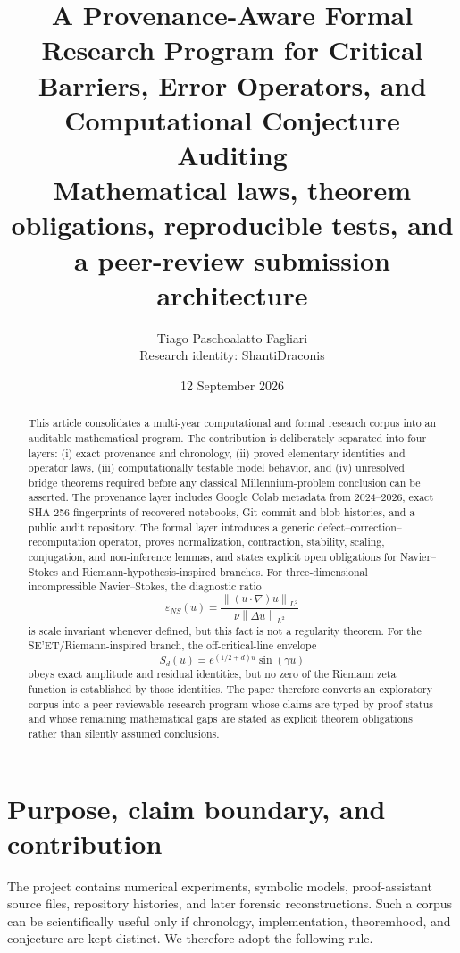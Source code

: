 \documentclass[11pt]{article}
\title{\textbf{A Provenance-Aware Formal Research Program for Critical Barriers, Error Operators, and Computational Conjecture Auditing}\\
\large Mathematical laws, theorem obligations, reproducible tests, and a peer-review submission architecture}
\author{Tiago Paschoalatto Fagliari\\Research identity: ShantiDraconis}
\date{12 September 2026}
\newcommand{\eps}{\varepsilon}
\newcommand{\norm}[1]{\left\lVert #1\right\rVert}
\begin{document}
\maketitle

\begin{abstract}
This article consolidates a multi-year computational and formal research corpus into an auditable mathematical program. The contribution is deliberately separated into four layers: (i) exact provenance and chronology, (ii) proved elementary identities and operator laws, (iii) computationally testable model behavior, and (iv) unresolved bridge theorems required before any classical Millennium-problem conclusion can be asserted. The provenance layer includes Google Colab metadata from 2024--2026, exact SHA-256 fingerprints of recovered notebooks, Git commit and blob histories, and a public audit repository. The formal layer introduces a generic defect--correction--recomputation operator, proves normalization, contraction, stability, scaling, conjugation, and non-inference lemmas, and states explicit open obligations for Navier--Stokes and Riemann-hypothesis-inspired branches. For three-dimensional incompressible Navier--Stokes, the diagnostic ratio
\[
\eps_{NS}(u)=\frac{\norm{(u\cdot\nabla)u}_{L^2}}{\nu\norm{\Delta u}_{L^2}}
\]
is scale invariant whenever defined, but this fact is not a regularity theorem. For the SE'ET/Riemann-inspired branch, the off-critical-line envelope
\[
S_d(u)=e^{(1/2+d)u}\sin(\gamma u)
\]
obeys exact amplitude and residual identities, but no zero of the Riemann zeta function is established by those identities. The paper therefore converts an exploratory corpus into a peer-reviewable research program whose claims are typed by proof status and whose remaining mathematical gaps are stated as explicit theorem obligations rather than silently assumed conclusions.
\end{abstract}

\section{Purpose, claim boundary, and contribution}
The project contains numerical experiments, symbolic models, proof-assistant source files, repository histories, and later forensic reconstructions. Such a corpus can be scientifically useful only if chronology, implementation, theoremhood, and conjecture are kept distinct. We therefore adopt the following rule.
\end{document}
